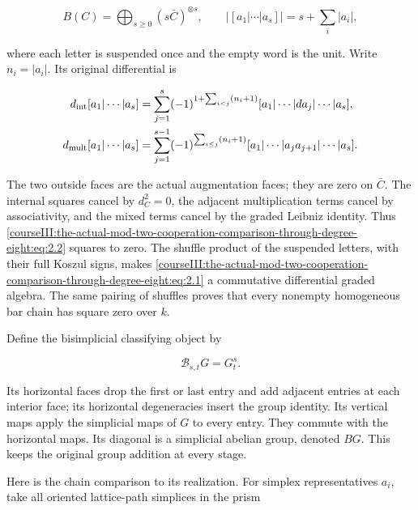 \begin{equation}
B(C)=\bigoplus_{s\geq0}(s\bar C)^{\otimes s},
\qquad |[a_1|\cdots|a_s]|=s+\sum_i|a_i|,
\label{courseIII:the-actual-mod-two-cooperation-comparison-through-degree-eight:eq:2.1}
\end{equation}

where each letter is suspended once and the empty word is the unit. Write \(n_i=|a_i|\). Its original differential is

\begin{equation}
\begin{aligned}
d_{\rm int}[a_1|\cdots|a_s]
 &=\sum_{j=1}^s(-1)^{1+\sum_{i<j}(n_i+1)}
 [a_1|\cdots|da_j|\cdots|a_s],\\
d_{\rm mult}[a_1|\cdots|a_s]
 &=\sum_{j=1}^{s-1}(-1)^{\sum_{i\leq j}(n_i+1)}
 [a_1|\cdots|a_ja_{j+1}|\cdots|a_s].
\end{aligned}
\label{courseIII:the-actual-mod-two-cooperation-comparison-through-degree-eight:eq:2.2}
\end{equation}

The two outside faces are the actual augmentation faces; they are zero on \(\bar C\). The internal squares cancel by \(d_C^2=0\), the adjacent multiplication terms cancel by associativity, and the mixed terms cancel by the graded Leibniz identity. Thus \eqref{courseIII:the-actual-mod-two-cooperation-comparison-through-degree-eight:eq:2.2} squares to zero. The shuffle product of the suspended letters, with their full Koszul signs, makes \eqref{courseIII:the-actual-mod-two-cooperation-comparison-through-degree-eight:eq:2.1} a commutative differential graded algebra. The same pairing of shuffles proves that every nonempty homogeneous bar chain has square zero over \(k\).

Define the bisimplicial classifying object by

\begin{equation}
\mathcal B_{s,t}G=G_t^s.
\label{courseIII:the-actual-mod-two-cooperation-comparison-through-degree-eight:eq:2.3}
\end{equation}

Its horizontal faces drop the first or last entry and add adjacent entries at each interior face; its horizontal degeneracies insert the group identity. Its vertical maps apply the simplicial maps of \(G\) to every entry. They commute with the horizontal maps. Its diagonal is a simplicial abelian group, denoted \(BG\). This keeps the original group addition at every stage.

Here is the chain comparison to its realization. For simplex representatives \(a_i\), take all oriented lattice-path simplices in the prism


